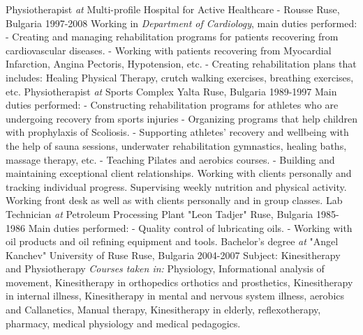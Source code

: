 \documentclass[11pt, a4paper]{awesome-cv}
\begin{document}
\vspace{+3mm}
\cventry
{Physiotherapist \textit{at}  Multi-profile Hospital for Active Healthcare - Rousse}
{Ruse, Bulgaria 1997-2008}
{
Working in \textit{Department of Cardiology}, main duties performed: 
\newline
\hspace{3ex} - Creating and managing rehabilitation programs for patients recovering from cardiovascular diseases.
\newline
\hspace{3ex} - Working with patients recovering from Myocardial Infarction, Angina Pectoris, Hypotension, etc.
\newline
\hspace{3ex} - Creating rehabilitation plans that includes: Healing Physical Therapy, crutch walking exercises, breathing exercises, etc.
}
\vspace{+3mm}
\cventry
{Physiotherapist \textit{at}  Sports Complex Yalta}
{Ruse, Bulgaria 1989-1997}
{
Main duties performed: 
\newline
\hspace{3ex} - Constructing rehabilitation programs for athletes who are undergoing recovery from sports injuries
\newline
\hspace{3ex} - Organizing programs that help children with prophylaxis of Scoliosis.   
\newline
\hspace{3ex} - Supporting athletes' recovery and wellbeing with the help of sauna sessions, underwater rehabilitation gymnastics, 
healing baths, massage therapy, etc.
\newline
\hspace{3ex} - Teaching Pilates and aerobics courses.
\newline
\hspace{3ex} - Building and maintaining exceptional client relationships. Working with clients personally and tracking individual progress. Supervising weekly nutrition and physical activity. Working front desk as well as with clients personally and in group classes. 
}
\vspace{+3mm}
\cventry
{Lab Technician \textit{at} Petroleum Processing Plant "Leon Tadjer"}
{Ruse, Bulgaria 1985-1986}
{
Main duties performed: 
\newline
\hspace{3ex} - Quality control of lubricating oils.
\newline
\hspace{3ex} - Working with oil products and oil refining equipment and tools.
}
\cventry
{Bachelor's degree \textit{at} "Angel Kanchev" University of Ruse}
{Ruse, Bulgaria 2004-2007}
{
Subject: Kinesitherapy and Physiotherapy
\newline
\textit{Courses taken in:} Physiology, Informational analysis of movement, Kinesitherapy in orthopedics orthotics and prosthetics, Kinesitherapy in internal illness, Kinesitherapy in mental and nervous system illness, aerobics and Callanetics, Manual therapy, Kinesitherapy in elderly, reflexotherapy, pharmacy, medical physiology and medical pedagogics.
}
\end{document}
